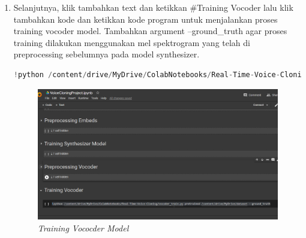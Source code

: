 \begin{enumerate}
\begin{lstlisting}[language=Python, caption=Vocoder Train]
\end{lstlisting}

\item Selanjutnya, klik tambahkan text dan ketikkan \#Training Vocoder lalu klik tambahkan kode dan ketikkan kode program untuk menjalankan proses training vocoder model. Tambahkan argument --ground\_truth agar proses training dilakukan menggunakan mel spektrogram yang telah di preprocessing sebelumnya pada model synthesizer.

\begin{lstlisting}[language=Python, caption=Training Vococder Model]
!python /content/drive/MyDrive/ColabNotebooks/Real-Time-Voice-Cloning/vocoder_train.py pretrained /content/drive/MyDrive/dataset --ground_truth
\end{lstlisting}

\begin{figure}[H]
    \centering
    \includegraphics[scale=0.35]{figures/colab16}
    \caption{\textit{Training Vococder Model}}
    \label{colab15}
\end{figure}

\end{enumerate}